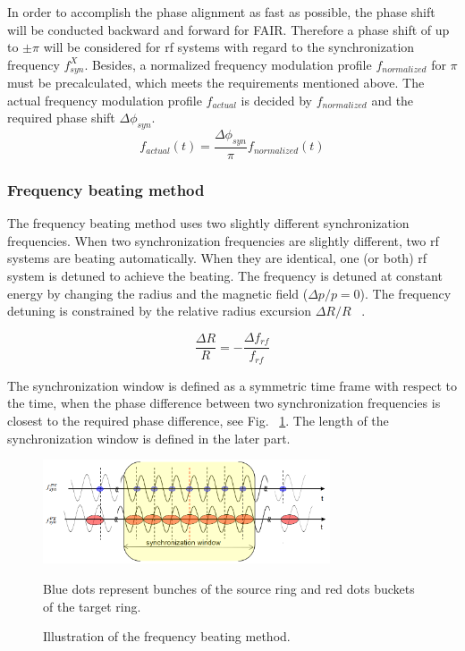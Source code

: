 In order to accomplish the phase alignment as fast as possible, the phase shift will be conducted backward and forward for FAIR. Therefore a phase shift of up to $\pm \pi$ will be considered for rf systems with regard to the synchronization frequency $f_\mathit{syn}^X$. Besides, a normalized frequency modulation profile $f_{normalized}$ for $\pi$ must be precalculated, which meets the requirements mentioned above. The actual frequency modulation profile $f_{actual}$ is decided by $f_{normalized}$ and the required phase shift $\Delta \phi_\mathit{syn}$. 
\begin{equation}
f_{\mathit{actual}}(t)=\frac{\Delta \phi_\mathit{syn}}{\pi}f_{\mathit{normalized}}(t) \label{actual_profile}
\end{equation}
 

\subsubsection{Frequency beating method}
The frequency beating method uses two slightly different synchronization frequencies. When two synchronization frequencies are slightly different, two rf systems are beating automatically. When they are identical, one (or both) rf system is detuned to achieve the beating. The frequency is detuned at constant energy by changing the radius and the magnetic field ($\Delta{p}/{p}=0$). The frequency detuning is constrained by the relative radius excursion $\Delta{R}/{R}$ ~\cite{bovet_selection_1970}. 

\begin{equation}
\frac{\Delta{R}}{R}= - \frac{\Delta f_{\mathit{rf}}}{f_{\mathit{rf}}} 
\label{eq:eq4}
\end{equation}

The synchronization window is defined as a symmetric time frame with respect to the time, when the phase difference between two synchronization frequencies is closest to the required phase difference, see Fig. ~\ref{frequency_beat}. The length of the synchronization window is defined in the later part.
\begin{figure}[!htb]
   \centering   
   \includegraphics*[width=85mm]{frequency_beating.png}
   \caption{Illustration of the frequency beating method.}{\small{Blue dots represent bunches of the source ring and red dots buckets of the target ring.}}
   \label{frequency_beat}
\end{figure}

